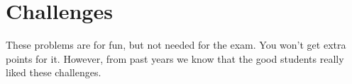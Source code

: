 \documentclass[a4paper,12pt]{article}
\begin{document}
\clearpage
\section{Challenges}
These problems are for fun, but not needed for the exam. You won't get extra points for it. However, from past years we know that the good students really liked these challenges.












% 
% 
\end{document}
